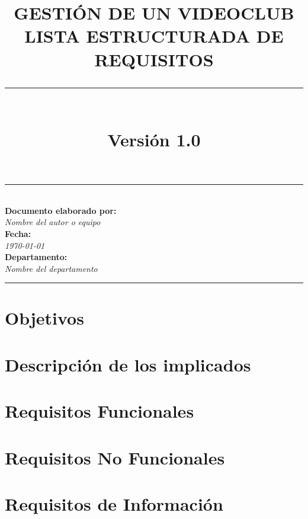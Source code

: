 \documentclass[a4paper,12pt]{book}
\title{
    \vspace*{3cm}
    {\Huge\textbf{GESTIÓN DE UN VIDEOCLUB}} \\
    \vspace{0.5cm}
    {\Large\textbf{LISTA ESTRUCTURADA DE REQUISITOS}} \\
    \vspace{1.5cm}
    \rule{\textwidth}{2pt} \\
    \vspace{1.5cm}
    {\large Versión 1.0}
}
\author{}
\date{}
\begin{document}
\begin{titlepage}
    \maketitle
    \vfill
    \begin{center}
        \rule{\textwidth}{1pt} \\
        \vspace{0.5cm}
        \textbf{\large Documento elaborado por:} \\
        \vspace{0.2cm}
        \textit{Nombre del autor o equipo} \\
        \vspace{0.5cm}
        \textbf{\large Fecha:} \\
        \vspace{0.2cm}
        \textit{\today} \\
        \vspace{0.5cm}
        \textbf{\large Departamento:} \\
        \vspace{0.2cm}
        \textit{Nombre del departamento} \\
        \vspace{0.5cm}
        \rule{\textwidth}{1pt}
    \end{center}
\end{titlepage}

\maketitle

\tableofcontents

\newpage
\chapter{Objetivos}


\newpage
\chapter{Descripción de los implicados}


\newpage
\chapter{Requisitos Funcionales}


\newpage
\chapter{Requisitos No Funcionales}


\newpage
\chapter{Requisitos de Información}

\end{document}
